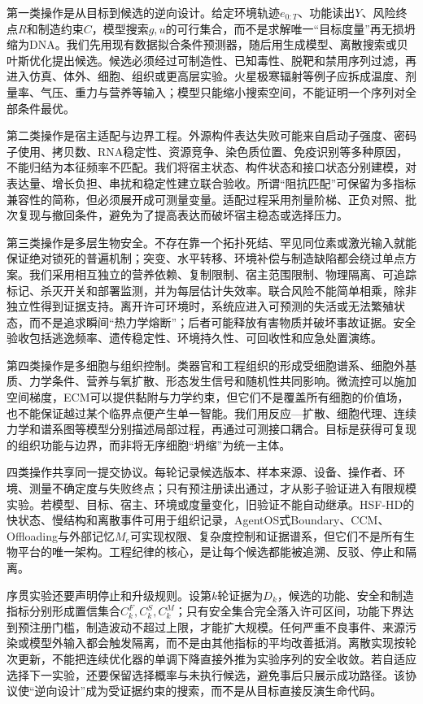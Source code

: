 第一类操作是从目标到候选的逆向设计。给定环境轨迹$e_{0:T}$、功能读出$Y$、风险终点$R$和制造约束$C$，模型搜索$g,u$的可行集合，而不是求解唯一“目标度量”再无损坍缩为DNA。我们先用现有数据拟合条件预测器，随后用生成模型、离散搜索或贝叶斯优化提出候选。候选必须经过可制造性、已知毒性、脱靶和禁用序列过滤，再进入仿真、体外、细胞、组织或更高层实验。火星极寒辐射等例子应拆成温度、剂量率、气压、重力与营养等输入；模型只能缩小搜索空间，不能证明一个序列对全部条件最优。

第二类操作是宿主适配与边界工程。外源构件表达失败可能来自启动子强度、密码子使用、拷贝数、RNA稳定性、资源竞争、染色质位置、免疫识别等多种原因，不能归结为本征频率不匹配。我们将宿主状态、构件状态和接口状态分别建模，对表达量、增长负担、串扰和稳定性建立联合验收。所谓“阻抗匹配”可保留为多指标兼容性的简称，但必须展开成可测量变量。适配过程采用剂量阶梯、正负对照、批次复现与撤回条件，避免为了提高表达而破坏宿主稳态或选择压力。

第三类操作是多层生物安全。不存在靠一个拓扑死结、罕见同位素或激光输入就能保证绝对锁死的普遍机制；突变、水平转移、环境补偿与制造缺陷都会绕过单点方案。我们采用相互独立的营养依赖、复制限制、宿主范围限制、物理隔离、可追踪标记、杀灭开关和部署监测，并为每层估计失效率。联合风险不能简单相乘，除非独立性得到证据支持。离开许可环境时，系统应进入可预测的失活或无法繁殖状态，而不是追求瞬间“热力学熔断”；后者可能释放有害物质并破坏事故证据。安全验收包括逃逸频率、遗传稳定性、环境持久性、可回收性和应急处置演练。

第四类操作是多细胞与组织控制。类器官和工程组织的形成受细胞谱系、细胞外基质、力学条件、营养与氧扩散、形态发生信号和随机性共同影响。微流控可以施加空间梯度，ECM可以提供黏附与力学约束，但它们不是覆盖所有细胞的价值场，也不能保证越过某个临界点便产生单一智能。我们用反应—扩散、细胞代理、连续力学和谱系图等模型分别描述局部过程，再通过可测接口耦合。目标是获得可复现的组织功能与边界，而非将无序细胞“坍缩”为统一主体。

四类操作共享同一提交协议。每轮记录候选版本、样本来源、设备、操作者、环境、测量不确定度与失败终点；只有预注册读出通过，才从影子验证进入有限规模实验。若模型、目标、宿主、环境或度量变化，旧验证不能自动继承。HSF-HD的快状态、慢结构和离散事件可用于组织记录，AgentOS式Boundary、CCM、Offloading与外部记忆$M_e$可实现权限、复杂度控制和证据谱系，但它们不是所有生物平台的唯一架构。工程纪律的核心，是让每个候选都能被追溯、反驳、停止和隔离。

序贯实验还要声明停止和升级规则。设第$k$轮证据为$D_k$，候选的功能、安全和制造指标分别形成置信集合$C_k^F,C_k^S,C_k^M$；只有安全集合完全落入许可区间，功能下界达到预注册门槛，制造波动不超过上限，才能扩大规模。任何严重不良事件、来源污染或模型外输入都会触发隔离，而不是由其他指标的平均改善抵消。离散实现按轮次更新，不能把连续优化器的单调下降直接外推为实验序列的安全收敛。若自适应选择下一实验，还要保留选择概率与未执行候选，避免事后只展示成功路径。该协议使“逆向设计”成为受证据约束的搜索，而不是从目标直接反演生命代码。


